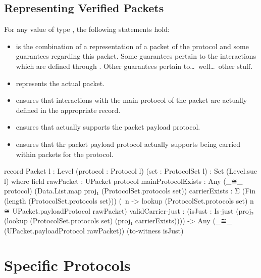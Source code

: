 \documentclass{report}
\begin{document}
\chapter{Representing Verified Packets}
For any value  of type   , the following statements hold:
	\begin{itemize}
	\item {} is the combination of a representation of a packet of the  protocol and some guarantees regarding this packet.  Some guarantees pertain to the interactions which are defined through .  Other guarantees pertain to\ldots{}\ well\ldots{}\ other stuff.
	\item {}  represents the actual packet.
	\item {}  ensures that interactions with the main protocol of the packet are actually defined in the appropriate  record.
	\item {}  ensures that  actually supports the packet payload protocol.
	\item {}  ensures that thr packet payload protocol actually supports being carried within packets for the  protocol.
\end{itemize}

\begin{code}
  record Packet {l : Level}
                (protocol : Protocol l)
                (set : ProtocolSet l) :
                Set (Level.suc l)
    where
    field
      rawPacket : UPacket protocol
      mainProtocolExists :
        Any (_≅_ protocol)
            (Data.List.map proj₁ (ProtocolSet.protocols set))
      carrierExists :
        Σ (Fin (length (ProtocolSet.protocols set)))
          (\ n -> lookup (ProtocolSet.protocols set) n ≅
                 UPacket.payloadProtocol rawPacket)
      validCarrier-just  :
        (isJust : Is-just (proj₂ (lookup (ProtocolSet.protocols set)
                                         (proj₁ carrierExists)))) ->
        Any (_≅_ (UPacket.payloadProtocol rawPacket)) (to-witness isJust)
\end{code}

\part{Specific Protocols}
\end{document}
